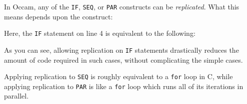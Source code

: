 In Occam, any of the \texttt{IF}, \texttt{SEQ}, or \texttt{PAR} constructs can
be \textit{replicated}. What this means depends upon the construct:

Here, the \texttt{IF} statement on line 4 is equivalent to the following:

As you can see, allowing replication on \texttt{IF} statements drastically
reduces the amount of code required in such cases, without complicating the
simple cases.

Applying replication to \texttt{SEQ} is roughly equivalent to a \texttt{for}
loop in C, while applying replication to \texttt{PAR} is like a \texttt{for}
loop which runs all of its iterations in parallel.
